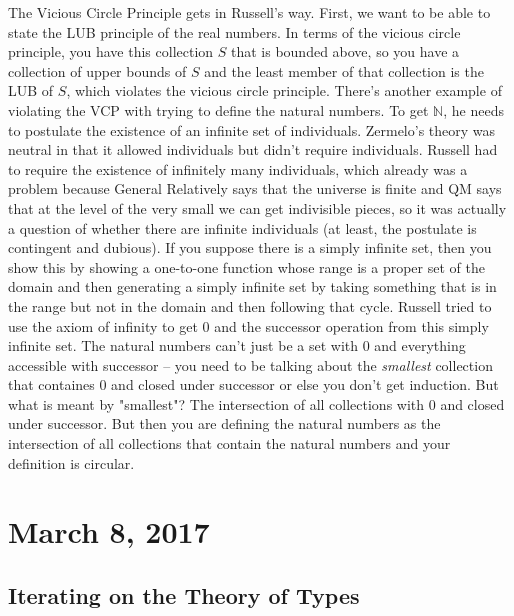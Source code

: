 \documentclass[12pt]{article}
\theoremstyle{definition}
\begin{document}
\begin{itemize}
        The Vicious Circle Principle gets in Russell's way. First, we want to
        be able to state the LUB principle of the real numbers. In terms of the
        vicious circle principle, you have this collection $S$ that is bounded
        above, so you have a collection of upper bounds of $S$ and the least
        member of that collection is the LUB of $S$, which violates the vicious
        circle principle. There's another example of violating the VCP with
        trying to define the natural numbers. To get $\mathbb{N}$, he needs to
        postulate the existence of an infinite set of individuals. Zermelo's
        theory was neutral in that it allowed individuals but didn't require
        individuals. Russell had to require the existence of infinitely many
        individuals, which already was a problem because General Relatively
        says that the universe is finite and QM says that at the level of the
        very small we can get indivisible pieces, so it was actually a question
        of whether there are infinite individuals (at least, the postulate is
        contingent and dubious). If you suppose there is a simply infinite set,
        then you show this by showing a one-to-one function whose range is a
        proper set of the domain and then generating a simply infinite set by
        taking something that is in the range but not in the domain and then
        following that cycle. Russell tried to use the axiom of infinity to get
        0 and the successor operation from this simply infinite set. The
        natural numbers can't just be a set with 0 and everything accessible
        with successor -- you need to be talking about the \textit{smallest}
        collection that containes 0 and closed under successor or else you
        don't get induction. But what is meant by "smallest"? The intersection
        of all collections with 0 and closed under successor. But then you are
        defining the natural numbers as the intersection of all collections
        that contain the natural numbers and your definition is circular. 
\end{itemize}

\section{March 8, 2017}

\subsection{Iterating on the Theory of Types}
\end{document}
